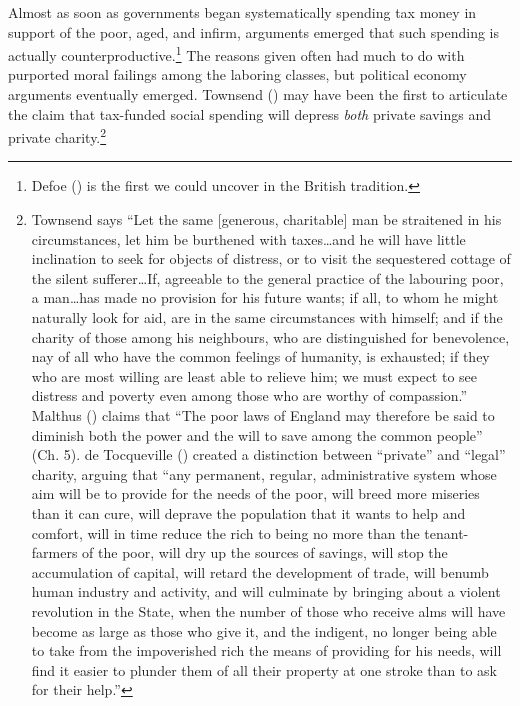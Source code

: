 \documentclass[
  11pt,
  oneside]{article}
\begin{document}
Almost as soon as governments began systematically spending tax money in support of the poor, aged, and infirm, arguments emerged that such spending is actually counterproductive.\footnote{Defoe () is the first we could uncover in the British tradition.} The reasons given often had much to do with purported moral failings among the laboring classes, but political economy arguments eventually emerged. Townsend () may have been the first to articulate the claim that tax-funded social spending will depress \emph{both} private savings and private charity.\footnote{Townsend says ``Let the same {[}generous, charitable{]} man be straitened in his circumstances, let him be burthened with taxes\ldots and he will have little inclination to seek for objects of distress, or to visit the sequestered cottage of the silent sufferer\ldots If, agreeable to the general practice of the labouring poor, a man\ldots has made no provision for his future wants; if all, to whom he might naturally look for aid, are in the same circumstances with himself; and if the charity of those among his neighbours, who are distinguished for benevolence, nay of all who have the common feelings of humanity, is exhausted; if they who are most willing are least able to relieve him; we must expect to see distress and poverty even among those who are worthy of compassion.'' Malthus () claims that ``The poor laws of England may therefore be said to diminish both the power and the will to save among the common people'' (Ch. 5). de Tocqueville () created a distinction between ``private'' and ``legal'' charity, arguing that ``any permanent, regular, administrative system whose aim will be to provide for the needs of the poor, will breed more miseries than it can cure, will deprave the population that it wants to help and comfort, will in time reduce the rich to being no more than the tenant-farmers of the poor, will dry up the sources of savings, will stop the accumulation of capital, will retard the development of trade, will benumb human industry and activity, and will culminate by bringing about a violent revolution in the State, when the number of those who receive alms will have become as large as those who give it, and the indigent, no longer being able to take from the impoverished rich the means of providing for his needs, will find it easier to plunder them of all their property at one stroke than to ask for their help.''}
\end{document}
